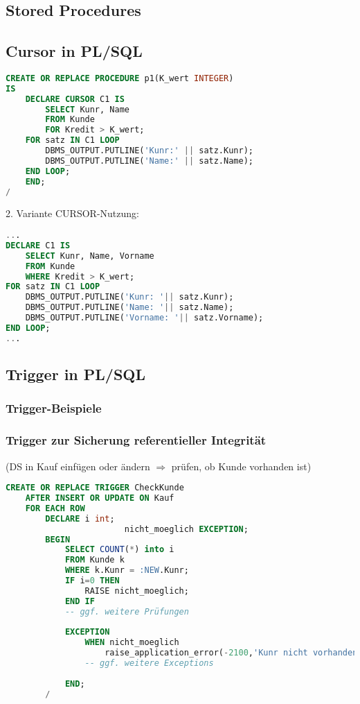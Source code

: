\subsection{Stored Procedures}
\subsection{Cursor in PL/SQL}
\begin{lstlisting}[language=SQL]
CREATE OR REPLACE PROCEDURE p1(K_wert INTEGER)
IS
    DECLARE CURSOR C1 IS
        SELECT Kunr, Name
        FROM Kunde
        FOR Kredit > K_wert;
    FOR satz IN C1 LOOP
        DBMS_OUTPUT.PUTLINE('Kunr:' || satz.Kunr);
        DBMS_OUTPUT.PUTLINE('Name:' || satz.Name);
    END LOOP;
    END;
/
\end{lstlisting}

2. Variante CURSOR-Nutzung:
\begin{lstlisting}[language=SQL]
...
DECLARE C1 IS 
	SELECT Kunr, Name, Vorname
	FROM Kunde
	WHERE Kredit > K_wert;
FOR satz IN C1 LOOP
	DBMS_OUTPUT.PUTLINE('Kunr: '|| satz.Kunr);
	DBMS_OUTPUT.PUTLINE('Name: '|| satz.Name);
	DBMS_OUTPUT.PUTLINE('Vorname: '|| satz.Vorname);
END LOOP;
...
\end{lstlisting}
\subsection{Trigger in PL/SQL}
\subsubsection{Trigger-Beispiele}
\subsubsection*{Trigger zur Sicherung referentieller Integrität}
(DS in Kauf einfügen oder ändern $\Rightarrow$ prüfen, ob Kunde vorhanden ist)
\begin{lstlisting}[language=SQL]
CREATE OR REPLACE TRIGGER CheckKunde
	AFTER INSERT OR UPDATE ON Kauf
	FOR EACH ROW
		DECLARE i int;
						nicht_moeglich EXCEPTION;
		BEGIN 
			SELECT COUNT(*) into i
			FROM Kunde k
			WHERE k.Kunr = :NEW.Kunr;
			IF i=0 THEN
				RAISE nicht_moeglich;
			END IF
			-- ggf. weitere Prüfungen
			
			EXCEPTION
				WHEN nicht_moeglich
					raise_application_error(-2100,'Kunr nicht vorhanden');
				-- ggf. weitere Exceptions
			
			END;
		/
\end{lstlisting}

